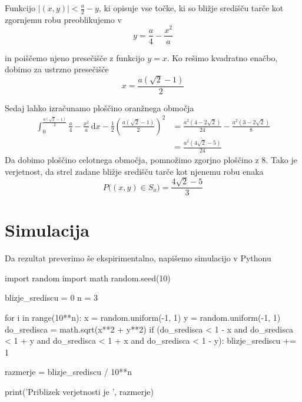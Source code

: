 \documentclass{amsart}
\theoremstyle{definition} %
\theoremstyle{plain} %
\begin{document}
Funkcijo $|(x,y)| < \frac{a}{2} - y$, ki opisuje vse točke, ki so bližje središču tarče kot
zgornjemu robu preoblikujemo v 
\begin{equation*}
    y = \frac{a}{4} - \frac{x^2}{a}
\end{equation*}

in poiščemo njeno presečišče z funkcijo $y = x$. Ko rešimo kvadratno enačbo,
dobimo za ustrzno presečišče
\begin{equation*}
    x=\frac{a(\sqrt{2}-1)}{2}
\end{equation*}

Sedaj lahko izračunamo ploščino oranžnega območja
\begin{align*}
    \int_{0}^{\frac{a(\sqrt{2}-1)}{2}} \frac{a}{4} - \frac{x^2}{a} \, \mathrm{d}x - \frac{1}{2}(\frac{a(\sqrt{2}-1)}{2})^2
    &= \frac{a^2(4-2\sqrt{2})}{24} - \frac{a^2(3-2\sqrt{2})}{8} \\
    &= \frac{a^2(4\sqrt{2}-5)}{24}
\end{align*}
Da dobimo ploščino celotnega območja, pomnožimo zgorjno ploščino z $8$. Tako je verjetnost, da strel zadane bližje središču
tarče kot njenemu robu enaka
\begin{equation*}
    P\big((x,y) \in S_a\big) = \frac{4\sqrt{2}-5}{3}
\end{equation*}

\pagebreak

\section{Simulacija}

Da rezultat preverimo še ekspirimentalno, napišemo simulacijo v Pythonu

\begin{python}
    import random
    import math
    random.seed(10)
    
    blizje_srediscu = 0
    n = 3
    
    for i in range(10**n):
        x = random.uniform(-1, 1)
        y = random.uniform(-1, 1)
        do_sredisca = math.sqrt(x**2 + y**2)
        if (do_sredisca < 1 - x and do_sredisca < 1 + y and
            do_sredisca < 1 + x  and do_sredisca < 1 - y):
            blizje_srediscu += 1
    
        razmerje = blizje_srediscu / 10**n
    
    print('Priblizek verjetnosti je ', razmerje)
\end{python}
\end{document}
